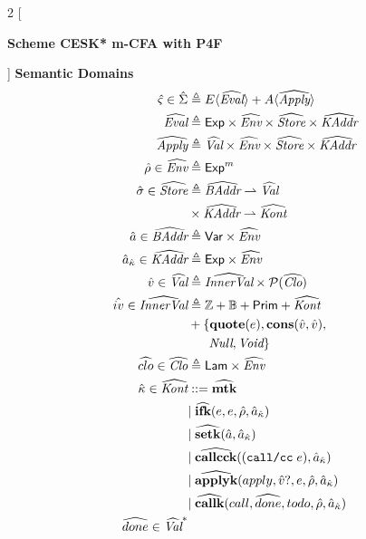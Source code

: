 \documentclass[12pt,draft]{article}
\newcommand{\callccsyn}[1]{(\texttt{call/cc}\;#1)}
\begin{document}
\begin{multicols*}{2}
  [
  \begin{center}
    \textbf{Scheme CESK* m-CFA with P4F}
  \end{center}
  ]
  \noindent\textbf{Semantic Domains}
  \begin{align*}
    \astate \in \aState &\triangleq E\langle \aEval \rangle
                          + A\langle \aApply \rangle \\
    \aEval &\triangleq \cExp \times \aEnv \times \aStore \times \aKAddr \\
    \aApply &\triangleq \aVal \times \aEnv \times \aStore \times \aKAddr \\
    \aenv \in \aEnv &\triangleq \cExp^m \\
    \astore \in \aStore &\triangleq \aBAddr \rightharpoonup \aVal \\
                        &\times \aKAddr \rightharpoonup \aKont \\
    \abaddr \in \aBAddr &\triangleq \cVar \times \aEnv \\
    \akaddr \in \aKAddr &\triangleq \cExp \times \aEnv \\
    \aval \in \aVal &\triangleq \aIVal \times \mathcal{P}(\aClo) \\
    \aival \in \aIVal &\triangleq \mathbb{Z} + \mathbb{B} + \cPrim + \aKont \\
                        & + \{\textbf{quote}(e) , \textbf{cons}(\aval, \aval) , \\
                        &\;\;\;\;\;\; \cNull , \cVoid \} \\
    \aclo \in \aClo &\triangleq \cLam \times \aEnv \\
    \akont \in \aKont &::= \amtk \\
                        &|\; \aifk{e}{e}{\aenv}{\akaddr} \\
                        &|\; \asetk{\abaddr}{\akaddr} \\
                        &|\; \acallcck{\callccsyn{e}}{\akaddr} \\
                        &|\; \aapplyk{apply}{\aval?}{e}{\aenv}{\akaddr} \\
                        &|\; \acallk{call}{\adone}{todo}{\aenv}{\akaddr} \\
    \adone \in \aVal^*&
  \end{align*}
  \vfill\null
  \columnbreak
\end{multicols*}
\end{document}
